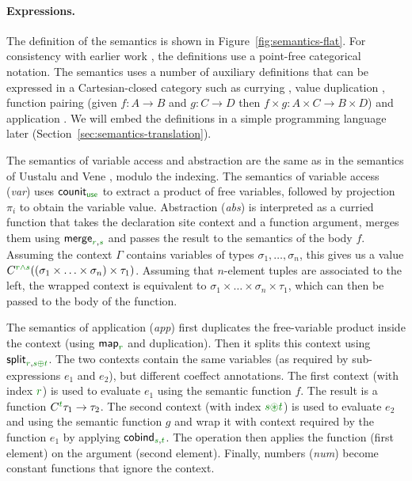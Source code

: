 \paragraph{Expressions.}
The definition of the semantics is shown in Figure~\ref{fig:semantics-flat}. For consistency
with earlier work \cite{comonads-notions,comonads-dom-thesis}, the definitions use a point-free
categorical notation. The semantics uses a number of auxiliary definitions that can be expressed
in a Cartesian-closed category such as currying , value duplication ,
function pairing (given $f:A\rightarrow B$ and $g:C\rightarrow D$ then $f\times g : A\times C \rightarrow B \times D$)
and application . We will embed the definitions in a simple programming language
later (Section~\ref{sec:semantics-translation}).

The semantics of variable access and abstraction are the same as in the semantics of Uustalu and
Vene \cite{comonads-notions}, modulo the indexing. The semantics of variable access (\emph{var}) uses
$\ident{counit}_{\cunit}$ to extract a product of free variables, followed by projection
$\pi_i$ to obtain the variable value. Abstraction (\emph{abs}) is interpreted as a curried
function that takes the declaration site context and a function argument, merges them using
$\ident{merge}_{\cclrd{r}, \cclrd{s}}$ and passes the result to the semantics of the body $f$.
Assuming the context $\Gamma$ contains variables of types $\sigma_1, \ldots, \sigma_n$, this gives
us a value $\ctyp{\cclrd{r}\czip\cclrd{s}}((\sigma_1 \times \ldots \times \sigma_n) \times \tau_1)$.
Assuming that $n$-element tuples are associated to the left, the wrapped context is equivalent to
$\sigma_1 \times \ldots \times \sigma_n \times \tau_1$, which can then be passed to the body of the
function.

The semantics of application (\emph{app}) first duplicates the free-variable product inside the
context (using $\ident{map}_{\cclrd{r}}$ and duplication). Then it splits this context using
$\ident{split}_{\cclrd{r}, \cclrd{s} \cpar \cclrd{t}}$. The two contexts contain the same variables
(as required by sub-expressions $e_1$ and $e_2$), but different coeffect annotations. The first
context (with index $\cclrd{r}$) is used to evaluate $e_1$ using the semantic function $f$. The
result is a function $\ctyp{\cclrd{t}}{\tau_1} \rightarrow \tau_2$. The second context
(with index $\cclrd{s}\cseq\cclrd{t}$) is used to evaluate $e_2$ and using the semantic function $g$
and wrap it with context required by the function $e_1$ by applying $\ident{cobind}_{\cclrd{s}, \cclrd{t}}$.
The  operation then applies the function (first element) on the argument (second element).
Finally, numbers (\emph{num}) become constant functions that ignore the context.

